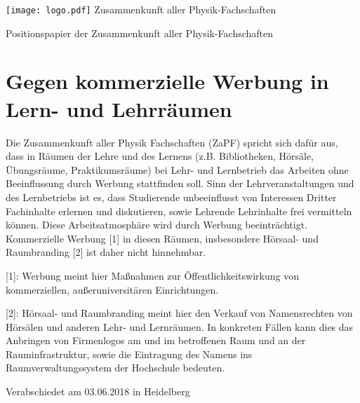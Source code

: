 \documentclass[DIV=calc]{scrartcl}
\begin{document}
    \hspace{0.87\textwidth}
    \begin{minipage}{120pt}
        \vspace{-1.8cm}
        \texttt{[image: logo.pdf]}
        \centering
        \small Zusammenkunft aller Physik-Fachschaften
    \end{minipage}
    \begin{center}
        \huge{Positionspapier der Zusammenkunft aller Physik-Fachschaften}\vspace{.25\baselineskip}\\
        \normalsize
    \end{center}
    \vspace{1cm} 
    \section*{Gegen kommerzielle Werbung in Lern- und Lehrräumen}
Die Zusammenkunft aller Physik Fachschaften (ZaPF)  spricht sich dafür aus, dass in Räumen der Lehre und des Lernens (z.B. Bibliotheken, Hörsäle, Übungsräume, Praktikumsräume) bei Lehr- und Lernbetrieb das Arbeiten ohne Beeinflussung durch Werbung stattfinden soll. Sinn der Lehrveranstaltungen und des Lernbetriebs ist es, dass Studierende unbeeinflusst von Interessen Dritter Fachinhalte erlernen und diskutieren, sowie Lehrende Lehrinhalte frei vermitteln können. Diese Arbeitsatmosphäre wird durch Werbung beeinträchtigt. 
Kommerzielle Werbung [1]  in diesen Räumen, insbesondere Hörsaal- und Raumbranding [2] ist daher nicht hinnehmbar. 


[1]: Werbung meint hier Maßnahmen zur Öffentlichkeitswirkung von kommerziellen, außeruniversitären Einrichtungen.

[2]: Hörsaal- und Raumbranding meint hier den Verkauf von Namensrechten von Hörsälen und anderen Lehr- und Lernräumen. In konkreten Fällen kann dies das Anbringen von Firmenlogos am und im betroffenen Raum und an der Rauminfrastruktur, sowie die Eintragung des Namens ins Raumverwaltungssystem der Hochschule bedeuten. 
\vfill
    \begin{flushright}
        Verabschiedet am 03.06.2018 in Heidelberg
    \end{flushright}
\end{document}
